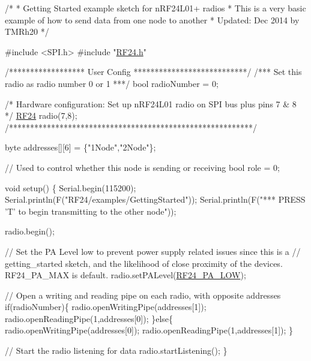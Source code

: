 \begin{DoxyCodeInclude}

\textcolor{comment}{/*}
\textcolor{comment}{* Getting Started example sketch for nRF24L01+ radios}
\textcolor{comment}{* This is a very basic example of how to send data from one node to another}
\textcolor{comment}{* Updated: Dec 2014 by TMRh20}
\textcolor{comment}{*/}

\textcolor{preprocessor}{#include <SPI.h>}
\textcolor{preprocessor}{#include "\hyperlink{RF24_8h}{RF24.h}"}

\textcolor{comment}{/****************** User Config ***************************/}
\textcolor{comment}{/***      Set this radio as radio number 0 or 1         ***/}
\textcolor{keywordtype}{bool} radioNumber = 0;

\textcolor{comment}{/* Hardware configuration: Set up nRF24L01 radio on SPI bus plus pins 7 & 8 */}
\hyperlink{classRF24}{RF24} radio(7,8);
\textcolor{comment}{/**********************************************************/}

byte addresses[][6] = \{\textcolor{stringliteral}{"1Node"},\textcolor{stringliteral}{"2Node"}\};

\textcolor{comment}{// Used to control whether this node is sending or receiving}
\textcolor{keywordtype}{bool} role = 0;

\textcolor{keywordtype}{void} setup() \{
  Serial.begin(115200);
  Serial.println(F(\textcolor{stringliteral}{"RF24/examples/GettingStarted"}));
  Serial.println(F(\textcolor{stringliteral}{"*** PRESS 'T' to begin transmitting to the other node"}));
  
  radio.begin();

  \textcolor{comment}{// Set the PA Level low to prevent power supply related issues since this is a}
 \textcolor{comment}{// getting\_started sketch, and the likelihood of close proximity of the devices. RF24\_PA\_MAX is default.}
  radio.setPALevel(\hyperlink{RF24_8h_a1e4cd0bea93e6b43422855fb0120aacea7d8d09f4a047b7c22655e56c98ca010c}{RF24\_PA\_LOW});
  
  \textcolor{comment}{// Open a writing and reading pipe on each radio, with opposite addresses}
  \textcolor{keywordflow}{if}(radioNumber)\{
    radio.openWritingPipe(addresses[1]);
    radio.openReadingPipe(1,addresses[0]);
  \}\textcolor{keywordflow}{else}\{
    radio.openWritingPipe(addresses[0]);
    radio.openReadingPipe(1,addresses[1]);
  \}
  
  \textcolor{comment}{// Start the radio listening for data}
  radio.startListening();
\}


\end{DoxyCodeInclude}
